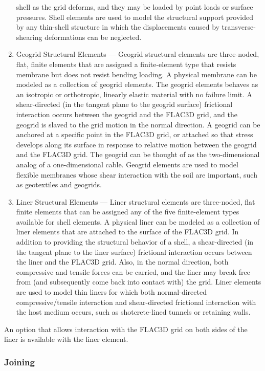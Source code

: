\documentclass[a4paper, nobind]{templates/ociamthesis}
\begin{document}
\begin{enumerate}
  shell as the grid deforms, and they may be loaded by point loads or
  surface pressures. Shell elements are used to model the structural
  support provided by any thin-shell structure in which the
  displacements caused by transverse-shearing deformations can be
  neglected.
\item
  Geogrid Structural Elements --- Geogrid structural elements are
  three-noded, flat, finite elements that are assigned a
  finite-element type that resists membrane but does not resist
  bending loading. A physical membrane can be modeled as a collection
  of geogrid elements. The geogrid elements behaves as an isotropic or
  orthotropic, linearly elastic material with no failure limit. A
  shear-directed (in the tangent plane to the geogrid surface)
  frictional interaction occurs between the geogrid and the FLAC3D
  grid, and the geogrid is slaved to the grid motion in the normal
  direction. A geogrid can be anchored at a specific point in the
  FLAC3D grid, or attached so that stress develops along its surface
  in response to relative motion between the geogrid and the FLAC3D
  grid. The geogrid can be thought of as the two-dimensional analog of
  a one-dimensional cable. Geogrid elements are used to model flexible
  membranes whose shear interaction with the soil are important, such
  as geotextiles and geogrids.
\item
  Liner Structural Elements --- Liner structural elements are
  three-noded, flat finite elements that can be assigned any of the
  five finite-element types available for shell elements. A physical
  liner can be modeled as a collection of liner elements that are
  attached to the surface of the FLAC3D grid. In addition to providing
  the structural behavior of a shell, a shear-directed (in the tangent
  plane to the liner surface) frictional interaction occurs between
  the liner and the FLAC3D grid. Also, in the normal direction, both
  compressive and tensile forces can be carried, and the liner may
  break free from (and subsequently come back into contact with) the
  grid. Liner elements are used to model thin liners for which both
  normal-directed compressive/tensile interaction and shear-directed
  frictional interaction with the host medium occurs, such as
  shotcrete-lined tunnels or retaining walls.
\end{enumerate}

An option that allows interaction with the FLAC3D grid on both sides of
the liner is available with the liner element.

\hypertarget{joining}{%
\subsubsection{Joining}\label{joining}}
\end{document}
